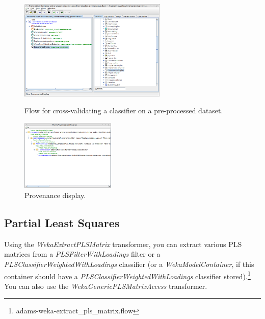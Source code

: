 \begin{figure}[ht]
  \begin{minipage}[t]{0.55\linewidth}
    \centering
    \includegraphics[width=7.0cm]{images/advanced-provenance-flow.png}
    \caption{Flow for cross-validating a classifier on a pre-processed dataset.}
    \label{advanced-provenance-flow}
  \end{minipage}
  \hspace{0.5cm}
  \begin{minipage}[t]{0.45\linewidth}
    \centering
    \includegraphics[width=4.5cm]{images/advanced-provenance-output.png}
    \caption{Provenance display.}
    \label{advanced-provenance-output}
  \end{minipage}
\end{figure}

\subsection{Partial Least Squares}
Using the \textit{WekaExtractPLSMatrix} transformer, you can extract various
PLS matrices from a \textit{PLSFilterWithLoadings} filter or a 
\textit{PLSClassifierWeightedWithLoadings} classifier (or a \textit{WekaModelContainer},
if this container should have a \textit{PLSClassifierWeightedWithLoadings} classifier 
stored).\footnote{adams-weka-extract\_pls\_matrix.flow}
You can also use the \textit{WekaGenericPLSMatrixAccess} transformer.